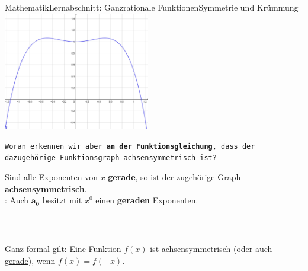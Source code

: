 \documentclass[11pt,twocolumn,oneside,openany,headings=optiontotoc,11pt,numbers=noenddot]{article}
\begin{document}
\begin{worksheet}{Mathematik}{Lernabschnitt: Ganzrationale Funktionen}{Symmetrie und Krümmung}
		\includegraphics[width=0.48\textwidth]{../99_Bilder/asymm_2.jpg}\\
		\par\noindent
		\texttt{Woran erkennen wir aber \textbf{an der Funktionsgleichung}, dass der dazugehörige Funktionsgraph achsensymmetrisch ist?}
		\begin{framed}
			\noindent
			Sind \underline{alle} Exponenten von \(x\) \textbf{gerade}, so ist der zugehörige Graph \textbf{achsensymmetrisch}.\\
			\normalcolor{}: Auch \(\mathbf{a_0}\) besitzt mit \(x^0\) einen \textbf{geraden} Exponenten.\\
			\par\noindent
			\rule{\textwidth}{0.1pt}\\
			\par\noindent
			Ganz formal gilt: Eine Funktion \(f(x)\) ist achsensymmetrisch (oder auch \underline{gerade}), wenn \(f(x) = f(-x)\).
		\end{framed}

\end{worksheet}
\end{document}
